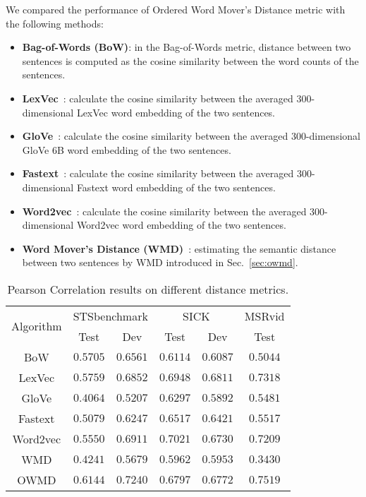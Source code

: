 We compared the performance of Ordered Word Mover's Distance metric with the following methods:

\begin{itemize}
\item \textbf{Bag-of-Words (BoW)}: in the Bag-of-Words metric, distance between two sentences is computed as the cosine similarity between the word counts of the sentences.

\item \textbf{LexVec}~\cite{salle2016enhancing}: calculate the cosine similarity between the  averaged 300-dimensional LexVec word embedding of the two sentences. 

\item \textbf{GloVe}~\cite{pennington2014glove}: calculate the cosine similarity between the averaged 300-dimensional GloVe 6B word embedding of the two sentences. 

\item \textbf{Fastext}~\cite{joulin2016bag}: calculate the cosine similarity between the averaged 300-dimensional Fastext word embedding of the two sentences. 

\item \textbf{Word2vec}~\cite{mikolov2013efficient}: calculate the cosine similarity between the averaged 300-dimensional Word2vec word embedding of the two sentences.

\item \textbf{Word Mover's Distance (WMD)}~\cite{kusner2015word}: estimating the semantic distance between two sentences by WMD introduced in Sec.~\ref{sec:owmd}.
\end{itemize} 


\begin{table}[tb]
  \caption{Pearson Correlation results on different distance metrics.}
  \label{tab:compare-pearson}
  \begin{tabular}{c|cc|cc|c}
    \toprule
    \multirow{2}{*}{Algorithm} & \multicolumn{2}{c}{STSbenchmark} & \multicolumn{2}{c}{SICK} & MSRvid\\ 
     & Test & Dev & Test & Dev & Test\\
    \midrule
    BoW & $0.5705$ & $0.6561$ & $0.6114$ & $0.6087$ & $0.5044$ \\
    LexVec & $0.5759$ & $0.6852$ & $0.6948$ & $\mathbf{0.6811}$ & $0.7318$\\
    GloVe & $0.4064$ & $0.5207$ & $0.6297$ & $0.5892$  & $0.5481$ \\
    Fastext & $0.5079$ & $0.6247$ & $0.6517$ & $0.6421$  & $0.5517$  \\
    Word2vec & $0.5550$ & $0.6911$ & $\mathbf{0.7021}$ & $0.6730$  & $0.7209$  \\
    WMD & $0.4241$ & $0.5679$ & $0.5962$ & $0.5953$  & $0.3430$  \\
    OWMD & $\mathbf{0.6144}$ & $\mathbf{0.7240}$ & $0.6797$ & $0.6772$  & $\mathbf{0.7519}$  \\
    \bottomrule
  \end{tabular}
  \vspace{-4mm}
\end{table}

